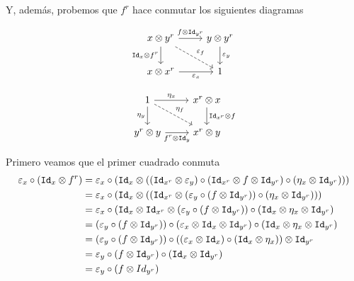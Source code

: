 \documentclass[../main.tex]{subfiles}
\begin{document}
    Y, además, probemos que $f^r$ hace conmutar los siguientes diagramas
    \begin{multicols}{2}
        \begin{equation*}
            \begin{tikzcd}
                x\otimes y^r \arrow{r}{f \otimes \id_{y^r}} \arrow[swap]{d}{\id_x \otimes f^r} \arrow[dashed]{dr}{\varepsilon_f} & y \otimes y^r \arrow{d}{\varepsilon_y} \\
                x \otimes x^r \arrow[swap]{r}{\varepsilon_x} & 1
            \end{tikzcd}
        \end{equation*}
    
        \begin{equation*}
            \begin{tikzcd}
                1 \arrow{r}{\eta_x} \arrow[swap]{d}{\eta_y} \arrow[dashed]{rd}{\eta_f} & x^r \otimes x \arrow{d}{\id_{x^r} \otimes f} \\
                y^r \arrow[swap]{r}{f^r \otimes \id_y} \otimes y & x^r \otimes y
            \end{tikzcd}
        \end{equation*}
    \end{multicols}
    Primero veamos que el primer cuadrado conmuta
    \begin{align*}
        \varepsilon_x \circ (\texttt{Id}_x \otimes f^r) &= \varepsilon_x \circ (\texttt{Id}_x \otimes  ((\texttt{Id}_{x^r} \otimes \varepsilon_y) \circ (\texttt{Id}_{x^r} \otimes f \otimes \texttt{Id}_{y^r}) \circ (\eta_x \otimes \texttt{Id}_{y^r})))  \\
        &= \varepsilon_x \circ (\texttt{Id}_x \otimes  ((\texttt{Id}_{x^r} \otimes (\varepsilon_y \circ (f \otimes \texttt{Id}_{y^r})) \circ (\eta_x \otimes \texttt{Id}_{y^r})))  \\
        &= \varepsilon_x \circ (\texttt{Id}_x \otimes  \texttt{Id}_{x^r} \otimes (\varepsilon_y \circ (f \otimes \texttt{Id}_{y^r})) \circ (\texttt{Id}_x \otimes \eta_x \otimes \texttt{Id}_{y^r}) \\
        &= (\varepsilon_y \circ (f \otimes \texttt{Id}_{y^r})) \circ (\varepsilon_x \otimes \texttt{Id}_x \otimes \texttt{Id}_{y^r}) \circ (\texttt{Id}_x \otimes \eta_x \otimes \texttt{Id}_{y^r}) \\
        &= (\varepsilon_y \circ (f \otimes \texttt{Id}_{y^r})) \circ ((\varepsilon_x \otimes \texttt{Id}_x) \circ (\texttt{Id}_x \otimes \eta_x )) \otimes \texttt{Id}_{y^r} \\
        &= \varepsilon_y \circ (f \otimes \texttt{Id}_{y^r}) \circ (\texttt{Id}_x \otimes \texttt{Id}_{y^r}) \\
        &= \varepsilon_y \circ (f \otimes Id_{y^r})
    \end{align*}
\end{document}
